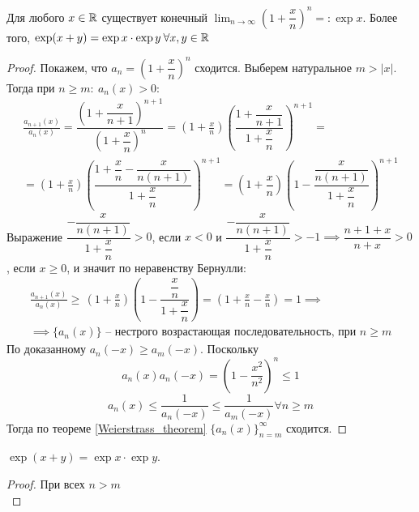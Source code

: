 \begin{theorem}
    Для любого $ x \in \mathbb{R} $ существует конечный $ \lim_{n \to \infty}\left(1 + \dfrac{x}{n}\right)^n = : \exp x $.
    Более того, $ \exp(x + y) = \exp x \cdot \exp y \: \forall x, y \in \mathbb{R} $
\end{theorem}
\begin{proof}
    Покажем, что $ a_n = \left(1 + \dfrac{x}{n}\right)^ n $ сходится. Выберем натуральное $ m > |x| $. Тогда при $ n \geq  m:\: a_n(x) > 0 $: \begin{multline*}
        \frac{a_{n + 1}(x)}{a_n(x)} = \dfrac{\left(1 + \dfrac{x}{n + 1}\right)^{n + 1}}{\left(1 + \dfrac{x}{n}\right)^n} = \left(1 + \frac{x}{n}\right)\left(\dfrac{1 + \dfrac{x}{n + 1}}{1 + \dfrac{x}{n}}\right)^{n + 1} =\\=\left(1 + \frac{x}{n}\right)\left(\dfrac{1 + \dfrac{x}{n} - \dfrac{x}{n(n + 1)}}{1 + \dfrac{x}{n}}\right)^{n + 1} = \left(1 + \dfrac{x}{n}\right)\left(1 - \dfrac{\dfrac{x}{n(n + 1)}}{1 + \dfrac{x}{n}}\right)^{n + 1}
    \end{multline*}
    Выражение $ \dfrac{ - \dfrac{x}{n(n + 1)}}{1 + \dfrac{x}{n}} > 0$, если $ x < 0$ и $ \dfrac{ - \dfrac{x}{n(n + 1)}}{1 + \dfrac{x}{n}}> - 1 \implies  \dfrac{n + 1 + x}{n + x} > 0 $, если $ x \geq 0 $, и значит по неравенству Бернулли: \begin{multline*}
        \frac{a_{n + 1}(x)}{a_n(x)} \geq\, \left(1 + \frac{x}{n}\right)\left(1 - \dfrac{\dfrac{x}{n}}{1 + \dfrac{x}{n}}\right) = \left(1 + \frac{x}{n} - \frac{x}{n}\right) = 1 \implies\\ \implies  \{a_n(x)\} \text{ -- нестрого возрастающая последовательность, при } n \geq m 
    \end{multline*}
    По доказанному $ a_n( - x) \geq  a_m( - x) $. Поскольку \begin{equation*}
        a_n(x)a_n( - x) = \left(1 - \frac{x^2}{n^2}\right)^n \leq 1
    \end{equation*}
    \begin{equation*}
    a_n(x) \leq \frac{1}{a_n( - x)} \leq \frac{1}{a_m( - x)} \forall n \geq m
   \end{equation*}
   Тогда по теореме \ref{Weierstrass_theorem} $ \{a_n(x)\}_{n = m}^ \infty $ сходится.
\end{proof} \begin{proposition}
     $ \exp(x + y) = \exp x \cdot \exp y $.
\end{proposition} \begin{proof}
    При всех $ n > m$ \begin{equation*}

\end{equation*}
\end{proof}
